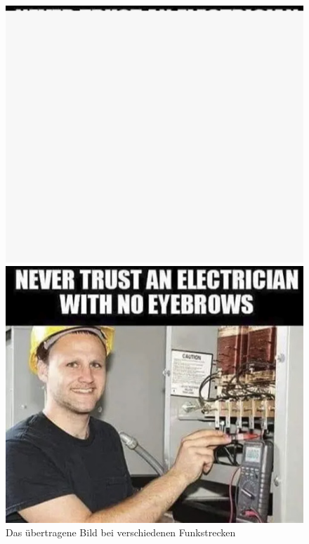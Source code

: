 \begin{figure}[H]
        \vspace{0.5cm}

        \begin{minipage}{0.45\textwidth}
            \centering
            \includegraphics[width=\linewidth]{Pictures/nochwenigergrosserabstand.jpg}
        \end{minipage}
        \hfill
        \begin{minipage}{0.45\textwidth}
            \centering
            \includegraphics[width=\linewidth]{Pictures/kleinerabstand.jpg}  
        \end{minipage}   
    \caption{Das übertragene Bild bei verschiedenen Funkstrecken}
    \label{fig:Task2d} 
    \end{figure}



